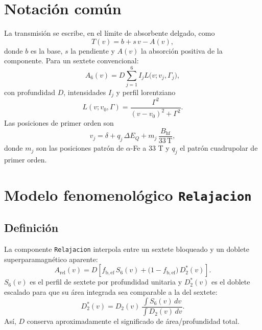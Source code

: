 \documentclass[11pt,a4paper]{article}
\newcommand{\BHF}{B_{\mathrm{hf}}}
\newcommand{\dEQ}{\Delta E_Q}
\newcommand{\code}[1]{\texttt{\small #1}}
\begin{document}
\section{Notación común}

La transmisión se escribe, en el límite de absorbente delgado, como
\begin{equation}
  T(v)=b+s\,v-A(v),
\end{equation}
donde $b$ es la base, $s$ la pendiente y $A(v)$ la absorción positiva de la
componente. Para un sextete convencional:
\begin{equation}
  A_{6}(v)=D\sum_{j=1}^{6} I_j L\bigl(v; v_j,\Gamma_j\bigr),
\end{equation}
con profundidad $D$, intensidades $I_j$ y perfil lorentziano
\begin{equation}
  L(v;v_0,\Gamma)=\frac{\Gamma^2}{(v-v_0)^2+\Gamma^2}.
\end{equation}
Las posiciones de primer orden son
\begin{equation}
  v_j = \delta + q_j\,\dEQ + m_j\,\frac{\BHF}{33\,\mathrm{T}},
\end{equation}
donde $m_j$ son las posiciones patrón de $\alpha$-Fe a $33$ T y $q_j$ el patrón
cuadrupolar de primer orden.

\section{Modelo fenomenológico \code{Relajacion}}

\subsection{Definición}

La componente \code{Relajacion} interpola entre un sextete bloqueado y un
doblete superparamagnético aparente:
\begin{equation}
  A_{\mathrm{rel}}(v)=D\left[
  f_{\mathrm{b,ef}}\,S_6(v)
  +\bigl(1-f_{\mathrm{b,ef}}\bigr)\,D_2^{\ast}(v)
  \right].
  \label{eq:rel-phen}
\end{equation}
$S_6(v)$ es el perfil de sextete por profundidad unitaria y $D_2^{\ast}(v)$ es
el doblete escalado para que su área integrada sea comparable a la del sextete:
\begin{equation}
  D_2^{\ast}(v)=D_2(v)\,
  \frac{\int S_6(v)\,dv}{\int D_2(v)\,dv}.
\end{equation}
Así, $D$ conserva aproximadamente el significado de área/profundidad total.
\end{document}

